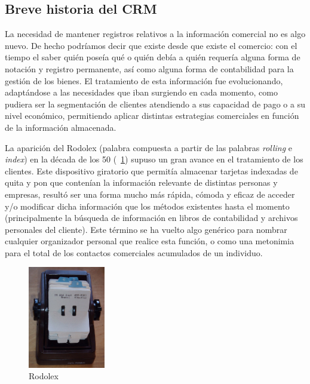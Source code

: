 \subsection{Breve historia del CRM}

La necesidad de mantener registros relativos a la información comercial no es algo nuevo. De hecho podríamos decir que existe desde que existe el comercio: con el tiempo el saber quién poseía qué o quién debía a quién requería alguna forma de notación y registro permanente, así como alguna forma de contabilidad para la gestión de los bienes. El tratamiento de esta información fue evolucionando, adaptándose a las necesidades que iban surgiendo en cada momento, como pudiera ser la segmentación de clientes atendiendo a sus capacidad de pago o a su nivel económico, permitiendo aplicar distintas estrategias comerciales en función de la información almacenada. 


La aparición del Rodolex (palabra compuesta a partir de las palabras \textit{rolling} e \textit{index}) en la década de los 50 (\figurename~\ref{fig:rodolex}) supuso un gran avance en el tratamiento de los clientes. Este dispositivo giratorio que permitía almacenar tarjetas indexadas de quita y pon que contenían la información relevante de distintas personas y empresas, resultó ser una forma mucho más rápida, cómoda y eficaz de acceder y/o modificar dicha información que los métodos existentes hasta el momento (principalmente la búsqueda de información en libros de contabilidad y archivos personales del cliente). Este término se ha vuelto algo genérico para nombrar cualquier organizador personal que realice esta función, o como una metonimia para el total de los contactos comerciales acumulados de un individuo.


\begin{figure}[H]
  \centering
  \includegraphics[width=0.3\textwidth]{imaxes/rodolex.png}
  \caption{Rodolex}
  \label{fig:rodolex}
\end{figure}





